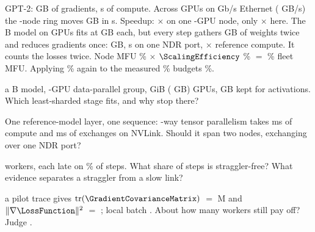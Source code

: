 \documentclass{studysheet}
\begin{document}
\begin{rightcol}
%
  {GPT-2:  GB of gradients,  s of compute. Across  GPUs on  Gb/s
   Ethernet ( GB/s) the -node ring moves  GB in  s. Speedup: $\times$ on one
   -GPU node, only $\times$ here.}{}
%
  {The B model on  GPUs fits at  GB each, but every step gathers  GB of
   weights twice and reduces gradients once:  GB,  s on one NDR port, $\times$ reference compute.}{}
%
  {It counts the losses twice. Node MFU \% $\times$ $\ScalingEfficiency$ \% $=$ \%
   fleet MFU. Applying \% again to the measured \% budgets \%.}{}

\vspace{2pt}
\begin{qs}
\item \assumed{} a B model, -GPU data-parallel group,  GiB ( GB) GPUs,  GB
  kept for activations. Which least-sharded stage fits, and why stop there?
\item One reference-model layer, one sequence: -way tensor parallelism takes  ms of compute and
   ms of exchanges on NVLink. Should it span two nodes, exchanging over one NDR port?
\item \assumed{}  workers, each late on \% of steps. What share of steps is straggler-free?
  What evidence separates a straggler from a slow link?
\item \assumed{} a pilot trace gives $\operatorname{tr}(\GradientCovarianceMatrix)$ $=$ M and $\lVert\nabla\LossFunction\rVert^{2}$ $=$ ;
  local batch . About how many workers still pay off? Judge .
\end{qs}
\end{rightcol}
\end{document}
